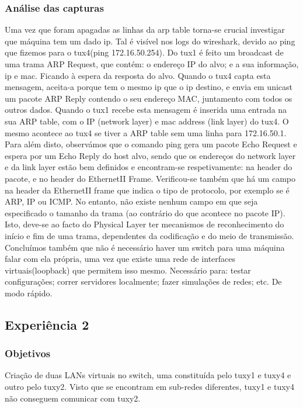 \documentclass[a4paper]{article}
\begin{document}
\subsubsection{Análise das capturas}
Uma vez que foram apagadas as linhas da arp table torna-se crucial investigar
que máquina tem um dado ip. Tal é visível nos logs do wireshark, devido ao ping
que fizemos para o tux4(ping 172.16.50.254). Do tux1 é feito um broadcast de
uma trama ARP Request, que contém: o endereço IP do alvo; e a sua informação,
ip e mac. Ficando à espera da resposta do alvo. Quando o tux4 capta esta
mensagem, aceita-a porque tem o mesmo ip que o ip destino, e envia em unicast
um pacote ARP Reply contendo o seu endereço MAC, juntamento com todos os outros
dados. Quando o tux1 recebe esta mensagem é inserida uma entrada na sua ARP
table, com o IP (network layer) e mac address (link layer) do tux4. O mesmo
acontece ao tux4 se tiver a ARP table sem uma linha para 172.16.50.1. Para além
disto, observámos que o comando ping gera um pacote Echo Request e espera por
um Echo Reply do host alvo, sendo que os endereços do network layer e da link
layer estão bem definidos e encontram-se respetivamente: na header do pacote, e
no header do EthernetII Frame. Verificou-se também que há um campo na header da
EthernetII frame que indica o tipo de protocolo, por exemplo se é ARP, IP ou
ICMP. No entanto, não existe nenhum campo em que seja especificado o tamanho da
trama (ao contrário do que acontece no pacote IP). Isto, deve-se ao facto do
Physical Layer ter mecanismos de reconhecimento do início e fim de uma trama,
dependentes da codificação e do meio de transmissão. Concluímos também que não
é necessário haver um switch para uma máquina falar com ela própria, uma vez
que existe uma rede de interfaces virtuais(loopback) que permitem isso mesmo.
Necessário para: testar configurações; correr servidores localmente; fazer
simulações de redes; etc. De modo rápido.

\subsection{Experiência 2}

\subsubsection{Objetivos}
Criação de duas LANs virtuais no switch, uma constituída pelo tuxy1 e tuxy4 e outro pelo tuxy2.
Visto que se encontram em sub-redes diferentes, tuxy1 e tuxy4 não conseguem comunicar com tuxy2.
\end{document}
